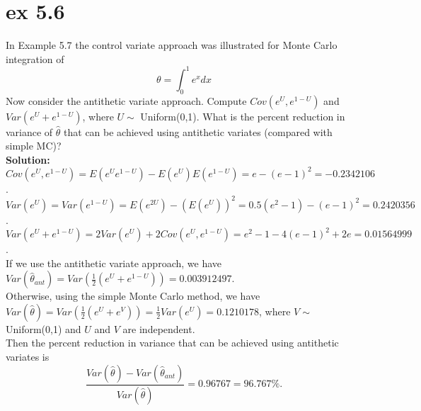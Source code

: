 \documentclass[UTF8]{ctexart}
\begin{document}
\section{ex 5.6}
In Example 5.7 the control variate approach was illustrated for Monte Carlo integration of
\begin{equation*}
    \theta = \int_{0}^{1} e^{x} dx
\end{equation*}
Now consider the antithetic variate approach. Compute $Cov(e^U, e^{1−U})$ and
$Var(e^U + e^{1−U})$, where $U \sim$ Uniform(0,1). What is the percent reduction in
variance of $\hat{\theta}$ that can be achieved using antithetic variates (compared with
simple MC)?\\
\textbf{Solution:}\\
$Cov(e^U, e^{1−U}) = E(e^Ue^{1−U}) - E(e^U)E(e^{1−U}) = e - (e-1)^2 = −0.2342106$.\\
$Var(e^U) = Var(e^{1−U})=E(e^{2U}) - (E(e^U))^2 = 0.5(e^2-1) - (e-1)^2 = 0.2420356$.\\
$Var(e^U + e^{1−U}) = 2Var(e^U)+2Cov(e^U, e^{1−U}) = e^2-1-4(e-1)^2+2e = 0.01564999$.\\
If we use the antithetic variate approach, we have
$Var(\hat{\theta}_{ant}) = Var(\frac{1}{2}(e^U + e^{1−U})) = 0.003912497$.\\
Otherwise, using the simple Monte Carlo method, we have $Var(\hat{\theta}) = Var(\frac{1}{2}(e^U+e^V)) = \frac{1}{2}Var(e^U)= 0.1210178$, where $V \sim$ Uniform(0,1) and $U$ and $V$ are independent.\\
Then the percent reduction in variance that can be achieved using antithetic variates is
\begin{equation*}
    \frac{Var(\hat{\theta}) - Var(\hat{\theta}_{ant})}{Var(\hat{\theta})}  = 0.96767 = 96.767\%.
\end{equation*}
\end{document}
